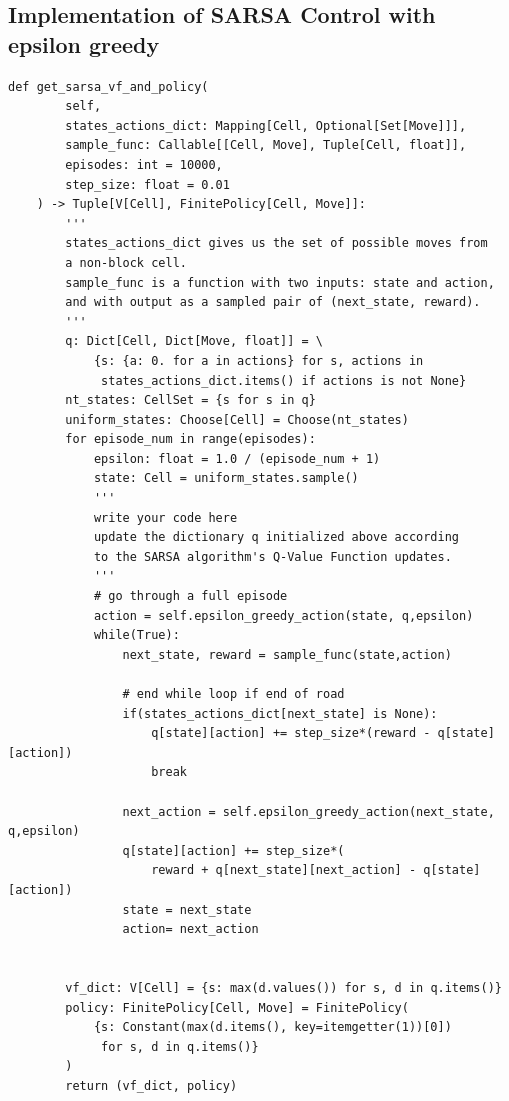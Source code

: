 \documentclass{article}[12pt]
\begin{document}
\subsection{Implementation of SARSA Control with epsilon greedy}
\begin{lstlisting}
def get_sarsa_vf_and_policy(
        self,
        states_actions_dict: Mapping[Cell, Optional[Set[Move]]],
        sample_func: Callable[[Cell, Move], Tuple[Cell, float]],
        episodes: int = 10000,
        step_size: float = 0.01
    ) -> Tuple[V[Cell], FinitePolicy[Cell, Move]]:
        '''
        states_actions_dict gives us the set of possible moves from
        a non-block cell.
        sample_func is a function with two inputs: state and action,
        and with output as a sampled pair of (next_state, reward).
        '''
        q: Dict[Cell, Dict[Move, float]] = \
            {s: {a: 0. for a in actions} for s, actions in
             states_actions_dict.items() if actions is not None}
        nt_states: CellSet = {s for s in q}
        uniform_states: Choose[Cell] = Choose(nt_states)
        for episode_num in range(episodes):
            epsilon: float = 1.0 / (episode_num + 1)
            state: Cell = uniform_states.sample()
            '''
            write your code here
            update the dictionary q initialized above according
            to the SARSA algorithm's Q-Value Function updates.
            '''
            # go through a full episode
            action = self.epsilon_greedy_action(state, q,epsilon)
            while(True):
                next_state, reward = sample_func(state,action)
                
                # end while loop if end of road
                if(states_actions_dict[next_state] is None):
                    q[state][action] += step_size*(reward - q[state][action])
                    break

                next_action = self.epsilon_greedy_action(next_state, q,epsilon)
                q[state][action] += step_size*(
                    reward + q[next_state][next_action] - q[state][action])
                state = next_state
                action= next_action


        vf_dict: V[Cell] = {s: max(d.values()) for s, d in q.items()}
        policy: FinitePolicy[Cell, Move] = FinitePolicy(
            {s: Constant(max(d.items(), key=itemgetter(1))[0])
             for s, d in q.items()}
        )
        return (vf_dict, policy)
\end{lstlisting}
\end{document}
